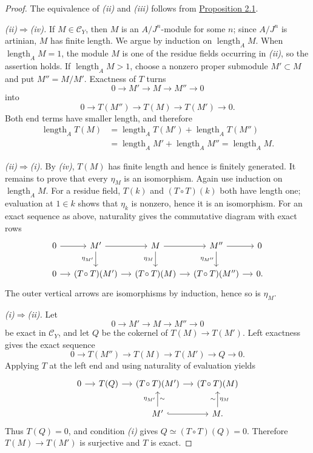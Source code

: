 \documentclass[11pt,a4paper,oneside]{book}
\providecommand{\srcpage}[1]{%
  \marginpar{\raggedright\scriptsize\color{gray}Original French p.~#1}}
\providecommand{\Ccat}{\mathcal C}
\providecommand{\ellA}{\operatorname{length}_A}
\theoremstyle{plain}
\theoremstyle{definition}
\theoremstyle{remark}
\begin{document}
\begin{proof}
The equivalence of \emph{(ii)} and \emph{(iii)} follows from
\hyperref[IV.2.1]{Proposition 2.1}.

\smallskip\noindent
\emph{(ii)$\Rightarrow$(iv).}
If $M\in\Ccat_Y$, then $M$ is an $A/J^n$-module for some $n$; since
$A/J^n$ is artinian, $M$ has finite length. We argue by induction on
$\ellA M$. When $\ellA M=1$, the module $M$ is one of the residue fields
occurring in \emph{(ii)}, so the assertion holds. If $\ellA M>1$, choose
a nonzero proper submodule $M'\subset M$ and put $M''=M/M'$. Exactness
of $T$ turns
\[
  0\longrightarrow M'\longrightarrow M\longrightarrow M''\longrightarrow0
\]
into
\[
  0\longrightarrow T(M'')\longrightarrow T(M)
   \longrightarrow T(M')\longrightarrow0.
\]
Both end terms have smaller length, and therefore
\[
\begin{aligned}
  \ellA T(M)
    &=\ellA T(M')+\ellA T(M'')\\
    &=\ellA M'+\ellA M''=\ellA M.
\end{aligned}
\]

\smallskip\noindent
\emph{(ii)$\Rightarrow$(i).}
By \emph{(iv)}, $T(M)$ has finite length and hence is finitely generated.
It remains to prove that every $\eta_M$ is an isomorphism. Again use
induction on $\ellA M$. For a residue field, $T(k)$ and $(T\circ T)(k)$
both have length one; evaluation at $1\in k$ shows that $\eta_k$ is
nonzero, hence it is an isomorphism. For an exact sequence as above,
naturality gives the
commutative diagram with exact rows\srcpage{50}
\[
\begin{tikzcd}[column sep=small]
0 \arrow[r] & M' \arrow[r] \arrow[d,"\eta_{M'}"']
  & M \arrow[r] \arrow[d,"\eta_M"']
  & M'' \arrow[r] \arrow[d,"\eta_{M''}"'] & 0\\
0 \arrow[r] & (T\!\circ T)(M') \arrow[r]
  & (T\!\circ T)(M) \arrow[r]
  & (T\!\circ T)(M'') \arrow[r] & 0.
\end{tikzcd}
\]
The outer vertical arrows are isomorphisms by induction, hence so is
$\eta_M$.

\smallskip\noindent
\emph{(i)$\Rightarrow$(ii).}
Let
\[
  0\longrightarrow M'\longrightarrow M\longrightarrow M''\longrightarrow0
\]
be exact in $\Ccat_Y$, and let $Q$ be the cokernel of
$T(M)\to T(M')$. Left exactness gives the exact sequence
\[
  0\longrightarrow T(M'')\longrightarrow T(M)
   \longrightarrow T(M')\longrightarrow Q\longrightarrow0.
\]
Applying $T$ at the left end and using naturality of evaluation yields
\[
\begin{tikzcd}[column sep=small]
0 \arrow[r] & T(Q) \arrow[r] & (T\!\circ T)(M') \arrow[r]
  & (T\!\circ T)(M)\\
&& M' \arrow[u,"\eta_{M'}","\sim"'] \arrow[r,hook]
  & M \arrow[u,"\eta_M"',"\sim"] .
\end{tikzcd}
\]
Thus $T(Q)=0$, and condition \emph{(i)} gives
$Q\simeq(T\circ T)(Q)=0$. Therefore $T(M)\to T(M')$ is surjective and
$T$ is exact.


\end{proof}
\end{document}
